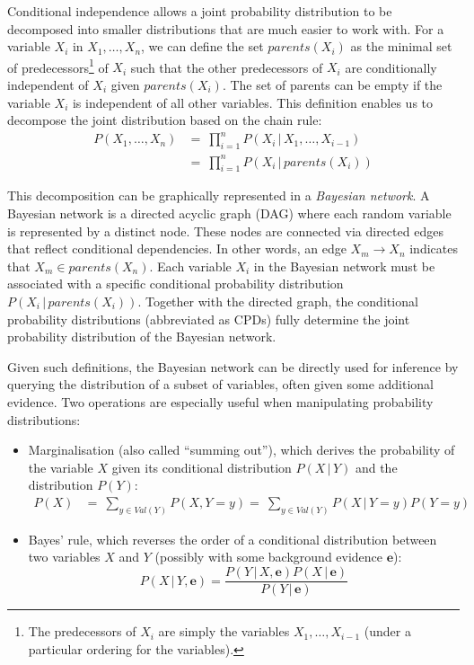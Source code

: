 Conditional independence allows a joint probability distribution to be decomposed into smaller distributions that are much easier to work with.  For a variable $X_i$ in $ X_1, \dots, X_n$, we can define the set $\mathit{parents}(X_i)$ as the minimal set of predecessors\footnote{The predecessors of $X_i$ are simply the variables $X_1,\dots, X_{i-1}$ (under a particular ordering for the variables).} of $X_i$ such that the other predecessors of $X_i$ are conditionally independent of $X_i$ given $\mathit{parents}(X_i)$.  The set of parents can be empty if the variable $X_i$ is independent of all other variables. This definition enables us to decompose the joint distribution based on the chain rule:
\begin{align}
P(X_1, \dots, X_n) & = \ \prod_{i=1}^n P(X_i  \, | \,  X_1, \dots, X_{i-1}) \\
&= \ \prod_{i=1}^n P(X_i  \, | \,  \mathit{parents}(X_i)) 
\end{align}

This decomposition can be graphically represented in a \textit{Bayesian network}.  A Bayesian network is a directed acyclic graph (DAG) where each random variable is represented by a distinct node.  These nodes are connected via directed edges that reflect conditional dependencies. In other words, an edge $X_m \rightarrow X_n$ indicates that $X_m \in \mathit{parents}(X_n)$. Each variable $X_i$ in the Bayesian network must be associated with a specific conditional probability distribution $P(X_i  \, | \,  \mathit{parents}(X_i))$.   Together with the directed graph, the conditional probability distributions (abbreviated as CPDs) fully determine the joint probability distribution of the Bayesian network.   

Given such definitions, the Bayesian network can be directly used for inference by querying the distribution of a subset of variables, often given some additional evidence. Two operations are especially useful when manipulating probability distributions: 
\begin{itemize}
\item Marginalisation (also called ``summing out''), which derives the probability of the variable $X$ given its conditional distribution $P(X \, | \, Y)$ and the distribution $P(Y)$: 
\begin{align}
P(X) & = \ \sum_{y \in \mathit{Val}(Y)} P(X,Y = y) = \ \sum_{y \in \mathit{Val}(Y)} P(X \, | \, Y = y) P(Y = y)
\end{align}
\item Bayes' rule, which reverses the order of a conditional distribution between two variables $X$ and $Y$ (possibly with some background evidence $\mathbf{e}$): 
\begin{equation}
P(X \, | \, Y, \mathbf{e}) = \frac{P(Y \, | \, X, \mathbf{e}) P(X \, | \, \mathbf{e})} {P(Y \, | \, \mathbf{e})} \label{eq:genbayes}
\end{equation}
\end{itemize}

